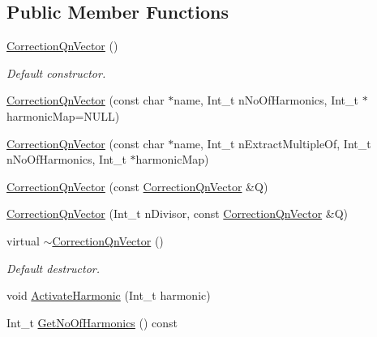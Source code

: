 \subsection*{Public Member Functions}
\begin{DoxyCompactItemize}
\item 
\mbox{\label{classQn_1_1CorrectionQnVector_a28007d64a859512c43ac7e7f1a477d9e}} 
\mbox{\hyperlink{classQn_1_1CorrectionQnVector_a28007d64a859512c43ac7e7f1a477d9e}{Correction\+Qn\+Vector}} ()
\begin{DoxyCompactList}\small\item\em Default constructor. \end{DoxyCompactList}\item 
\mbox{\hyperlink{classQn_1_1CorrectionQnVector_a4cb37d125c255b433565248dd0054f27}{Correction\+Qn\+Vector}} (const char $\ast$name, Int\+\_\+t n\+No\+Of\+Harmonics, Int\+\_\+t $\ast$harmonic\+Map=N\+U\+LL)
\item 
\mbox{\hyperlink{classQn_1_1CorrectionQnVector_a9463528777b5ad1dbe0f68f4d575d7fa}{Correction\+Qn\+Vector}} (const char $\ast$name, Int\+\_\+t n\+Extract\+Multiple\+Of, Int\+\_\+t n\+No\+Of\+Harmonics, Int\+\_\+t $\ast$harmonic\+Map)
\item 
\mbox{\hyperlink{classQn_1_1CorrectionQnVector_a667da9b9391dc7b3aeb45dfbdbf35c31}{Correction\+Qn\+Vector}} (const \mbox{\hyperlink{classQn_1_1CorrectionQnVector}{Correction\+Qn\+Vector}} \&Q)
\item 
\mbox{\hyperlink{classQn_1_1CorrectionQnVector_af1d34ffbe05b79eb8125bcf44033b790}{Correction\+Qn\+Vector}} (Int\+\_\+t n\+Divisor, const \mbox{\hyperlink{classQn_1_1CorrectionQnVector}{Correction\+Qn\+Vector}} \&Q)
\item 
\mbox{\label{classQn_1_1CorrectionQnVector_a51d5ab05176552adff4e7bce1612864a}} 
virtual \mbox{\hyperlink{classQn_1_1CorrectionQnVector_a51d5ab05176552adff4e7bce1612864a}{$\sim$\+Correction\+Qn\+Vector}} ()
\begin{DoxyCompactList}\small\item\em Default destructor. \end{DoxyCompactList}\item 
void \mbox{\hyperlink{classQn_1_1CorrectionQnVector_a6fcf855ca57bab1752ebb8098aa8da8d}{Activate\+Harmonic}} (Int\+\_\+t harmonic)
\item 
Int\+\_\+t \mbox{\hyperlink{classQn_1_1CorrectionQnVector_a4da8a1b6a2f12c2393ae86b5fa19b0ae}{Get\+No\+Of\+Harmonics}} () const

\end{DoxyCompactItemize}
